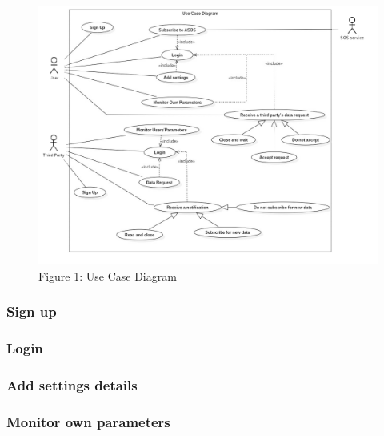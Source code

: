 \def\A {Name}
\def\B {Actors}
\def\C {Entry conditions}
\def\D {Event Flow}
\def\E {Exit conditions}
\def\F {Exceptions}
\def\G {Goals}
\def\H {Requirements}

\renewcommand{\arraystretch}{1.5}

\begin{figure}[h!]
	\includegraphics[width=1.1\textwidth]{./pictures/usecase_diagram.png}\par
	\caption{Figure 1: Use Case Diagram}
\end{figure}

\FloatBarrier

\subsubsection{Sign up}


\subsubsection{Login}


\subsubsection{Add settings details}


\subsubsection{Monitor own parameters}


